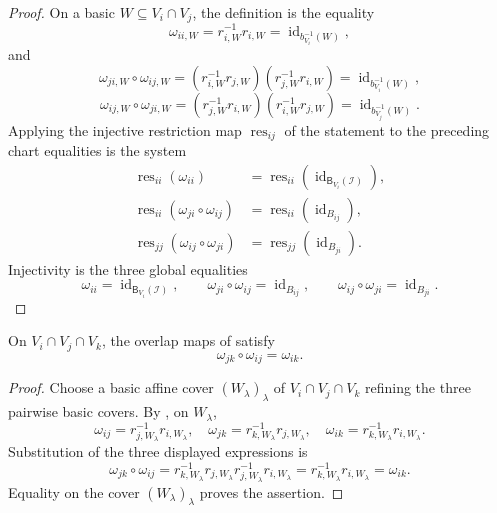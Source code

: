 \begin{proof}
  On a basic $W\subseteq V_i\cap V_j$, the definition is the equality
  \[
    \omega_{ii,W}=r_{i,W}^{-1}r_{i,W}
      =\operatorname{id}_{b_{V_i}^{-1}(W)},
  \]
  and
  \[
    \omega_{ji,W}\circ\omega_{ij,W}
      =(r_{i,W}^{-1}r_{j,W})(r_{j,W}^{-1}r_{i,W})
      =\operatorname{id}_{b_{V_i}^{-1}(W)},
  \]
  \[
    \omega_{ij,W}\circ\omega_{ji,W}
      =(r_{j,W}^{-1}r_{i,W})(r_{i,W}^{-1}r_{j,W})
      =\operatorname{id}_{b_{V_j}^{-1}(W)}.
  \]
  Applying the injective restriction map $\operatorname{res}_{ij}$ of the
  statement to the preceding chart equalities is the system
  \[
  \begin{aligned}
    \operatorname{res}_{ii}(\omega_{ii})
      &=\operatorname{res}_{ii}
        (\operatorname{id}_{\mathsf B_{V_i}(\mathcal I)}),\\
    \operatorname{res}_{ii}(\omega_{ji}\circ\omega_{ij})
      &=\operatorname{res}_{ii}
        (\operatorname{id}_{B_{ij}}),\\
    \operatorname{res}_{jj}(\omega_{ij}\circ\omega_{ji})
      &=\operatorname{res}_{jj}
        (\operatorname{id}_{B_{ji}}).
  \end{aligned}
  \]
  Injectivity is the three global equalities
  \[
    \omega_{ii}=\operatorname{id}_{\mathsf B_{V_i}(\mathcal I)},
    \qquad
    \omega_{ji}\circ\omega_{ij}=\operatorname{id}_{B_{ij}},
    \qquad
    \omega_{ij}\circ\omega_{ji}=\operatorname{id}_{B_{ji}}.
  \]
\end{proof}

\begin{lemma}
  \label{lemma:nagata-global-blowup-overlap-cocycle}

  On $V_i\cap V_j\cap V_k$, the overlap maps of
   satisfy
  \[
    \omega_{jk}\circ\omega_{ij}=\omega_{ik}.
  \]
\end{lemma}

\begin{proof}
  Choose a basic affine cover $(W_\lambda)_\lambda$ of
  $V_i\cap V_j\cap V_k$ refining the three pairwise basic covers.  By
  , on $W_\lambda$,
  \[
    \omega_{ij}=r_{j,W_\lambda}^{-1}r_{i,W_\lambda},
    \quad
    \omega_{jk}=r_{k,W_\lambda}^{-1}r_{j,W_\lambda},
    \quad
    \omega_{ik}=r_{k,W_\lambda}^{-1}r_{i,W_\lambda}.
  \]
  Substitution of the three displayed expressions is
  \[
    \omega_{jk}\circ\omega_{ij}
      =r_{k,W_\lambda}^{-1}r_{j,W_\lambda}
        r_{j,W_\lambda}^{-1}r_{i,W_\lambda}
      =r_{k,W_\lambda}^{-1}r_{i,W_\lambda}
      =\omega_{ik}.
  \]
  Equality on the cover $(W_\lambda)_\lambda$ proves the assertion.
\end{proof}

